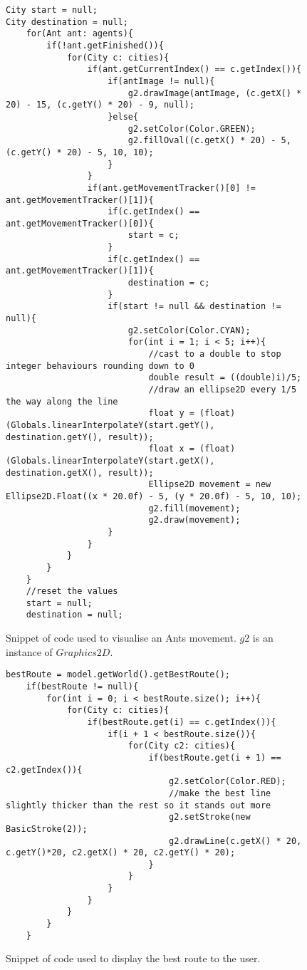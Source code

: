 \begin{figure}[H]
\begin{lstlisting}
City start = null;
City destination = null;
	for(Ant ant: agents){
		if(!ant.getFinished()){
			for(City c: cities){
				if(ant.getCurrentIndex() == c.getIndex()){
					if(antImage != null){
						g2.drawImage(antImage, (c.getX() * 20) - 15, (c.getY() * 20) - 9, null);
					}else{
						g2.setColor(Color.GREEN);
						g2.fillOval((c.getX() * 20) - 5, (c.getY() * 20) - 5, 10, 10);
					}
				}
				if(ant.getMovementTracker()[0] != ant.getMovementTracker()[1]){
					if(c.getIndex() == ant.getMovementTracker()[0]){
						start = c;
					}
					if(c.getIndex() == ant.getMovementTracker()[1]){
						destination = c;
					}
					if(start != null && destination != null){
						g2.setColor(Color.CYAN);
						for(int i = 1; i < 5; i++){
							//cast to a double to stop integer behaviours rounding down to 0
							double result = ((double)i)/5;
							//draw an ellipse2D every 1/5 the way along the line
							float y = (float) (Globals.linearInterpolateY(start.getY(), destination.getY(), result));
							float x = (float) (Globals.linearInterpolateY(start.getX(), destination.getX(), result));
							Ellipse2D movement = new Ellipse2D.Float((x * 20.0f) - 5, (y * 20.0f) - 5, 10, 10);
							g2.fill(movement);
							g2.draw(movement);
					}
				}
			}
		}
	}
	//reset the values
	start = null;
	destination = null;
\end{lstlisting}
\caption{Snippet of code used to visualise an Ants movement. $g2$ is an instance of $Graphics2D$.}
\label{antWalk}
\end{figure}

\begin{figure}[H]
\begin{lstlisting}
bestRoute = model.getWorld().getBestRoute();
	if(bestRoute != null){
		for(int i = 0; i < bestRoute.size(); i++){
			for(City c: cities){
				if(bestRoute.get(i) == c.getIndex()){
					if(i + 1 < bestRoute.size()){
						for(City c2: cities){
							if(bestRoute.get(i + 1) == c2.getIndex()){
								g2.setColor(Color.RED);
								//make the best line slightly thicker than the rest so it stands out more
								g2.setStroke(new BasicStroke(2));
								g2.drawLine(c.getX() * 20, c.getY()*20, c2.getX() * 20, c2.getY() * 20);
							}
						}
					}
				}
			}
		}
	}
\end{lstlisting}
\caption{Snippet of code used to display the best route to the user.}
\label{bestCode}
\end{figure}

